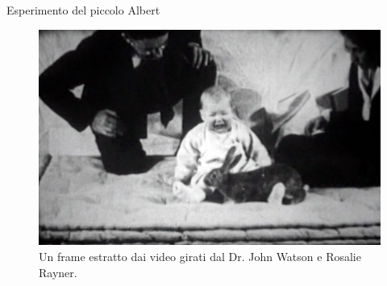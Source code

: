 \documentclass[12pt]{book} %
\begin{document}
\needspace{4cm}
\begin{mdframed}[linewidth=1pt]
Esperimento del piccolo Albert

\begin{figure}
  \centering
  \includegraphics[width=0.95\linewidth]{images/Libro-img002.jpg}
  \begin{minipage}{\linewidth}
    \caption{Un frame estratto dai video girati dal Dr. John Watson e Rosalie Rayner.}
  \end{minipage}
\end{figure}


\end{mdframed}
\end{document}
